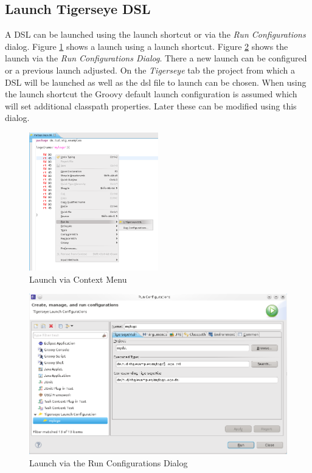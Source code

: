 	
	\subsection{Launch Tigerseye DSL}
	  A  DSL can be launched using the launch shortcut or via the \textit{Run Configurations} dialog. Figure \ref{fig:launch_shortcut} shows a launch using a launch shortcut. Figure  \ref{fig:launch_run_configurations_dialog} shows the launch via the \emph{Run Configurations Dialog}. There a new launch can be configured or a previous launch adjusted. On the \emph{Tigerseye} tab the project from which a DSL will be launched as well as the dsl file to launch can be chosen. When using the launch shortcut the Groovy default launch configuration is assumed which will set additional classpath properties. Later these can be modified using this dialog.
	
	\begin{figure}
	  \centering
	  \includegraphics[width=0.5\textwidth]{../pics/launch_shortcut.png}
	  \caption{Launch via Context Menu}
	  \label{fig:launch_shortcut}
	\end{figure}

	\begin{figure}
	  \centering
	  \includegraphics[width=.5\textwidth]{../pics/launch_run_configurations_dialog.png}
	  \caption{Launch via the Run Configurations Dialog}
	  \label{fig:launch_run_configurations_dialog}
	\end{figure}
 
